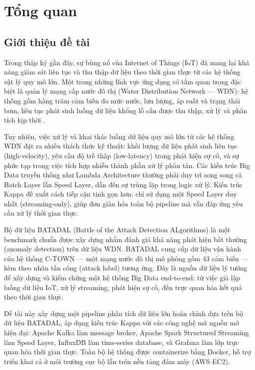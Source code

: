 \section{Tổng quan}

\subsection{Giới thiệu đề tài}

Trong thập kỷ gần đây, sự bùng nổ của Internet of Things (IoT) đã mang lại khả năng
giám sát liên tục và thu thập dữ liệu theo thời gian thực từ các hệ thống vật lý quy
mô lớn. Một trong những lĩnh vực ứng dụng có tầm quan trọng đặc biệt là quản lý mạng
cấp nước đô thị (Water Distribution Network --- WDN): hệ thống gồm hàng trăm cảm
biến đo mức nước, lưu lượng, áp suất và trạng thái bơm, liên tục phát sinh luồng dữ
liệu khổng lồ cần được thu thập, xử lý và phân tích kịp thời
\cite{taormina2018batadal}.

Tuy nhiên, việc xử lý và khai thác luồng dữ liệu quy mô lớn từ các hệ thống WDN đặt
ra nhiều thách thức kỹ thuật: khối lượng dữ liệu phát sinh liên tục (high-velocity),
yêu cầu độ trễ thấp (low-latency) trong phát hiện sự cố, và sự phức tạp trong việc
tích hợp nhiều thành phần xử lý phân tán. Các kiến trúc Big Data truyền thống như
Lambda Architecture thường phải duy trì song song cả Batch Layer lẫn Speed Layer,
dẫn đến sự trùng lặp trong logic xử lý. Kiến trúc Kappa \cite{kreps2014kappa} đề xuất
cách tiếp cận tinh gọn hơn: chỉ sử dụng một Speed Layer duy nhất (streaming-only),
giúp đơn giản hóa toàn bộ pipeline mà vẫn đáp ứng yêu cầu xử lý thời gian thực.

Bộ dữ liệu BATADAL (Battle of the Attack Detection ALgorithms) \cite{taormina2018batadal}
là một benchmark chuẩn được xây dựng nhằm đánh giá khả năng phát hiện bất thường
(anomaly detection) trên dữ liệu WDN. BATADAL cung cấp dữ liệu vận hành của hệ thống
C-TOWN --- một mạng nước đô thị mô phỏng gồm 43 cảm biến --- kèm theo nhãn tấn công
(attack label) tương ứng. Đây là nguồn dữ liệu lý tưởng để xây dựng và kiểm chứng
một hệ thống Big Data end-to-end: từ việc giả lập luồng dữ liệu IoT, xử lý streaming,
phát hiện sự cố, đến trực quan hóa kết quả theo thời gian thực.

Đề tài này xây dựng một pipeline phân tích dữ liệu lớn hoàn chỉnh dựa trên bộ dữ
liệu BATADAL, áp dụng kiến trúc Kappa với các công nghệ mã nguồn mở hiện đại:
Apache Kafka \cite{kreps2011kafka} làm message broker, Apache Spark Structured
Streaming \cite{zaharia2016spark} làm Speed Layer, InfluxDB làm time-series database,
và Grafana làm lớp trực quan hóa thời gian thực. Toàn bộ hệ thống được containerize
bằng Docker, hỗ trợ triển khai cả ở môi trường cục bộ lẫn trên nền tảng đám mây
(AWS EC2).

